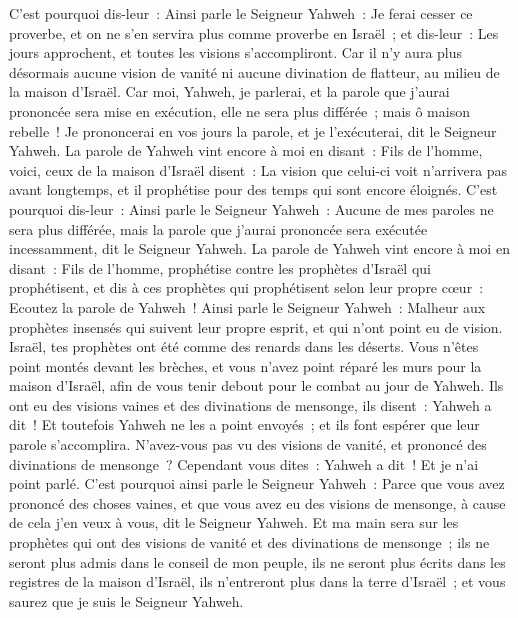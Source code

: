 \begin{multicols}{2}
C'est pourquoi dis-leur~: Ainsi parle le Seigneur Yahweh~: Je ferai cesser ce proverbe, et on ne s'en servira plus comme proverbe en Israël~; et dis-leur~: Les jours approchent, et toutes les visions s'accompliront.
Car il n'y aura plus désormais aucune vision de vanité ni aucune divination de flatteur, au milieu de la maison d'Israël.
Car moi, Yahweh, je parlerai, et la parole que j'aurai prononcée sera mise en exécution, elle ne sera plus différée~; mais ô maison rebelle~! Je prononcerai en vos jours la parole, et je l'exécuterai, dit le Seigneur Yahweh.
La parole de Yahweh vint encore à moi en disant~:
Fils de l'homme, voici, ceux de la maison d'Israël disent~: La vision que celui-ci voit n'arrivera pas avant longtemps, et il prophétise pour des temps qui sont encore éloignés.
C'est pourquoi dis-leur~: Ainsi parle le Seigneur Yahweh~: Aucune de mes paroles ne sera plus différée, mais la parole que j'aurai prononcée sera exécutée incessamment, dit le Seigneur Yahweh.
\VerseOne{}La parole de Yahweh vint encore à moi en disant~:
Fils de l'homme, prophétise contre les prophètes d'Israël qui prophétisent, et dis à ces prophètes qui prophétisent selon leur propre cœur~: Ecoutez la parole de Yahweh~!
Ainsi parle le Seigneur Yahweh~: Malheur aux prophètes insensés qui suivent leur propre esprit, et qui n'ont point eu de vision.
Israël, tes prophètes ont été comme des renards dans les déserts.
Vous n'êtes point montés devant les brèches, et vous n'avez point réparé les murs pour la maison d'Israël, afin de vous tenir debout pour le combat au jour de Yahweh.
Ils ont eu des visions vaines et des divinations de mensonge, ils disent~: Yahweh a dit~! Et toutefois Yahweh ne les a point envoyés~; et ils font espérer que leur parole s'accomplira.
N'avez-vous pas vu des visions de vanité, et prononcé des divinations de mensonge~? Cependant vous dites~: Yahweh a dit~! Et je n'ai point parlé.
C'est pourquoi ainsi parle le Seigneur Yahweh~: Parce que vous avez prononcé des choses vaines, et que vous avez eu des visions de mensonge, à cause de cela j'en veux à vous, dit le Seigneur Yahweh.
Et ma main sera sur les prophètes qui ont des visions de vanité et des divinations de mensonge~; ils ne seront plus admis dans le conseil de mon peuple, ils ne seront plus écrits dans les registres de la maison d'Israël, ils n'entreront plus dans la terre d'Israël~; et vous saurez que je suis le Seigneur Yahweh.

\end{multicols}
